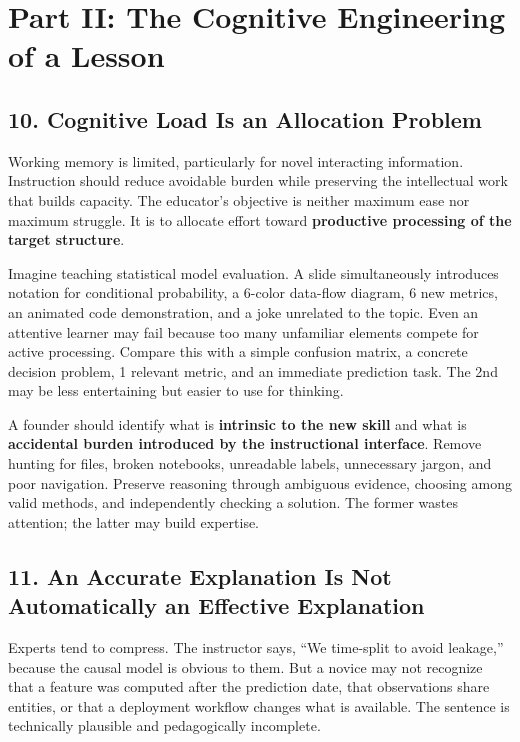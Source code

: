\section*{Part II: The Cognitive Engineering of a Lesson}

\subsection*{10. Cognitive Load Is an Allocation Problem}

Working memory is limited, particularly for novel interacting information. Instruction should reduce avoidable burden while preserving the intellectual work that builds capacity. The educator's objective is neither maximum ease nor maximum struggle. It is to allocate effort toward \textbf{productive processing of the target structure}.

Imagine teaching statistical model evaluation. A slide simultaneously introduces notation for conditional probability, a 6-color data-flow diagram, 6 new metrics, an animated code demonstration, and a joke unrelated to the topic. Even an attentive learner may fail because too many unfamiliar elements compete for active processing. Compare this with a simple confusion matrix, a concrete decision problem, 1 relevant metric, and an immediate prediction task. The 2nd may be less entertaining but easier to use for thinking.

A founder should identify what is \textbf{intrinsic to the new skill} and what is \textbf{accidental burden introduced by the instructional interface}. Remove hunting for files, broken notebooks, unreadable labels, unnecessary jargon, and poor navigation. Preserve reasoning through ambiguous evidence, choosing among valid methods, and independently checking a solution. The former wastes attention; the latter may build expertise.

\subsection*{11. An Accurate Explanation Is Not Automatically an Effective Explanation}

Experts tend to compress. The instructor says, ``We time-split to avoid leakage,'' because the causal model is obvious to them. But a novice may not recognize that a feature was computed after the prediction date, that observations share entities, or that a deployment workflow changes what is available. The sentence is technically plausible and pedagogically incomplete.

